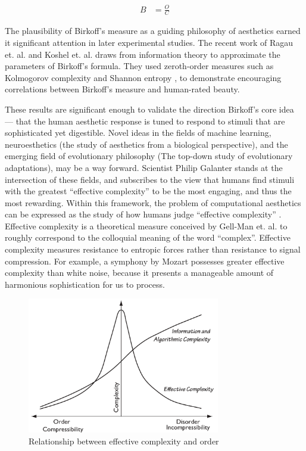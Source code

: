 \documentclass[midd]{thesis}
\begin{document}
\begin{align*}
B &= \frac{O}{C}
\end{align*}

The plausibility of Birkoff's measure as a guiding philosophy of aesthetics earned it significant attention in later experimental studies. The recent work of Ragau et. al. and Koshel et. al. draws from information theory to approximate the parameters of Birkoff's formula. They used zeroth-order measures such as Kolmogorov complexity and Shannon entropy \cite{rigau-1, koshelev-1}, to demonstrate encouraging correlations between Birkoff's measure and human-rated beauty.

These results are significant enough to validate the direction Birkoff's core idea --- that the human aesthetic response is tuned to respond to stimuli that are sophisticated yet digestible. Novel ideas in the fields of machine learning, neuroesthetics (the study of aesthetics from a biological perspective), and the emerging field of evolutionary philosophy (The top-down study of evolutionary adaptations), may be a way forward. Scientist Philip Galanter stands at the intersection of these fields, and subscribes to the view that humans find stimuli with the greatest ``effective complexity'' to be the most engaging, and thus the most rewarding. Within this framework, the problem of computational aesthetics can be expressed as the study of how humans judge ``effective complexity'' \cite{galanter-1,galanter-2,galanter-3,galanter-4}. Effective complexity is a theoretical measure conceived by Gell-Man et. al. \cite{gell2004effective} to roughly correspond to the colloquial meaning of the word ``complex''. Effective complexity measures resistance to entropic forces rather than resistance to signal compression. For example, a symphony by Mozart possesses greater effective complexity than white noise, because it presents a manageable amount of harmonious sophistication for us to process.

\begin{figure}
\centering
\includegraphics[width=0.75\textwidth]{figures/effectivecomplexity.pdf}
\caption{Relationship between effective complexity and order}
\label{fig:effectivecomplexity}
\end{figure}
\end{document}
